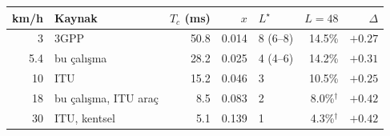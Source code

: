 \begin{tabular}{rlrrlrr}
\toprule
km/h & Kaynak & $T_c$ (ms) & $x$ & $L^\star$ & $L{=}48$ & $\Delta$ \\
\midrule
3 & 3GPP~\cite{3gpp_tr38913} & 50.8 & 0.014 & 8 (6--8) & 14.5\% & $+0.27$ \\
5.4 & bu çalışma & 28.2 & 0.025 & 4 (4--6) & 14.2\% & $+0.31$ \\
10 & ITU~\cite{itu_m2410} & 15.2 & 0.046 & 3 & 10.5\% & $+0.25$ \\
18 & bu çalışma, ITU araç & 8.5 & 0.083 & 2 & 8.0\%$^\dagger$ & $+0.42$ \\
30 & ITU, kentsel & 5.1 & 0.139 & 1 & 4.3\%$^\dagger$ & $+0.42$ \\
\bottomrule
\end{tabular}
